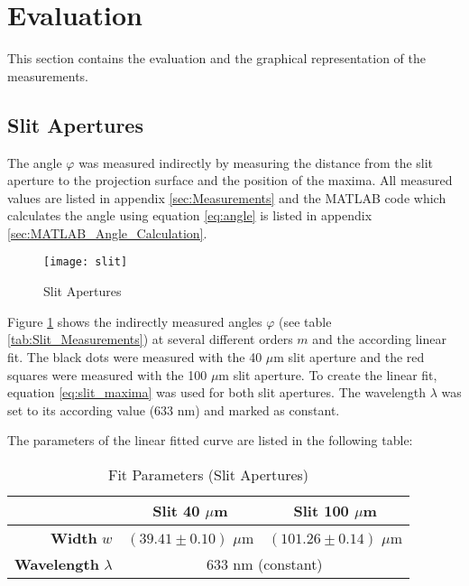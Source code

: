 \section{Evaluation}
\label{sec:Evaluation}
This section contains the evaluation and the graphical representation of the measurements.

\subsection{Slit Apertures}
\label{subsec:Slit}
The angle $\varphi$ was measured indirectly by measuring the distance from the slit aperture to the projection surface and the position of the maxima. All measured values are listed in appendix \ref{sec:Measurements} and the MATLAB code which calculates the angle using equation \ref{eq:angle} is listed in appendix \ref{sec:MATLAB_Angle_Calculation}.
\begin{figure}[H]
	\centering
	\texttt{[image: slit]}
	\caption{Slit Apertures}
	\label{fig:Slit}
\end{figure}
Figure \ref{fig:Slit} shows the indirectly measured angles $\varphi$ (see table \ref{tab:Slit_Measurements}) at several different orders $m$ and the according linear fit. The black dots were measured with the 40 $\mu$m slit aperture and the red squares were measured with the 100 $\mu$m slit aperture. To create the linear fit, equation \ref{eq:slit_maxima} was used for both slit apertures. The wavelength $\lambda$ was set to its according value (633 nm) and marked as constant.

The parameters of the linear fitted curve are listed in the following table:
\begin{table}[H]
	\centering
	\renewcommand{\arraystretch}{1.3}
	\begin{tabular}{r|c c}
		& \textbf{Slit 40 $\mu$m} & \textbf{Slit 100 $\mu$m} \\
		\hline\hline
		\textbf{Width} $w$ & $(39.41\pm0.10)$ $\mu$m & $(101.26\pm0.14)$ $\mu$m \\		
		\textbf{Wavelength} $\lambda$ & \multicolumn{2}{c}{633 nm (constant)}
	\end{tabular}
	\caption{Fit Parameters (Slit Apertures)}
	\label{tab:Slit}
\end{table}
\newpage
